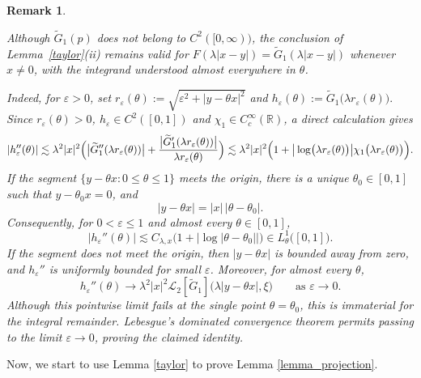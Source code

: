 \documentclass[reqno]{amsart}
\newtheorem{remark}[theorem]{Remark}
\numberwithin{equation}{section}
\begin{document}
\begin{remark}\label{remark:taylor-log}
{\rm	Although
$	\widetilde{G}_1(p)$
	does not belong to \(C^2([0,\infty))\), the conclusion of
	Lemma~\ref{taylor}\textup{(ii)} remains valid for
	\(F(\lambda|x-y|)=\widetilde{G}_1(\lambda|x-y|)\) whenever \(x\neq0\), with the integrand
	understood almost everywhere in \(\theta\).

    
	Indeed, 
	for \(\varepsilon>0\), set
	$
	r_\varepsilon(\theta)
	:=
	\sqrt{\varepsilon^2+|y-\theta x|^2}$ and 
	$h_\varepsilon(\theta)
	:=
	\widetilde{G}_1\bigl(\lambda r_\varepsilon(\theta)\bigr).
	$
 Since \(r_\varepsilon(\theta)>0\),
	\(h_\varepsilon\in C^2([0,1])\) and  \(\chi_1\in C_c^\infty(\mathbb{R})\), a direct calculation gives
	\[
	|h_\varepsilon''(\theta)|
	\lesssim
	\lambda^2|x|^2
	\Big(
	\bigl|\widetilde{G}_1''(\lambda r_\varepsilon(\theta))\bigr|
	+
	\frac{
		\bigl|\widetilde{G}_1'(\lambda r_\varepsilon(\theta))\bigr|
	}{
		\lambda r_\varepsilon(\theta)
	}
	\Big)\lesssim \lambda^2|x|^2\Bigl(1+\big|\log\bigl(\lambda r_\varepsilon(\theta)\bigr)\big|\chi_1\bigl(\lambda r_\varepsilon(\theta)\bigr)\Bigr).
	\]
	If the segment
	\(\{y-\theta x:0\le\theta\le1\}\) meets the origin, there is a
	unique \(\theta_0\in[0,1]\) such that \(y-\theta_0x=0\), and
	\[
	|y-\theta x|=|x|\,|\theta-\theta_0|.
	\]
	Consequently, for \(0<\varepsilon\le1\) and almost every
	\(\theta\in[0,1]\),
	\[
	|h_\varepsilon''(\theta)|
	\lesssim C_{\lambda,x}
	\bigl(1+|\log|\theta-\theta_0||\bigr)\in L_\theta^1\bigl([0,1]\bigr).
	\]
	If the segment does not meet
	the origin, then \(|y-\theta x|\) is bounded away from zero, and
	\(h_\varepsilon''\) is uniformly bounded for small \(\varepsilon\).
	Moreover, for almost every \(\theta\),
	\[
	h_\varepsilon''(\theta)
	\longrightarrow
	\lambda^2|x|^2
	\mathcal L_2[\widetilde{G}_1]
	\bigl(\lambda|y-\theta x|,\xi\bigr)
	\qquad\text{as }\varepsilon\to0.
	\]
	Although this pointwise limit  fails at the single point
	\(\theta=\theta_0\), this is immaterial for the integral remainder.
	Lebesgue's dominated convergence theorem  permits passing
	to the limit \(\varepsilon\to0\), proving the claimed identity.}
\end{remark}





Now, we start to use Lemma \ref{taylor} to prove Lemma \ref{lemma_projection}.
\end{document}
